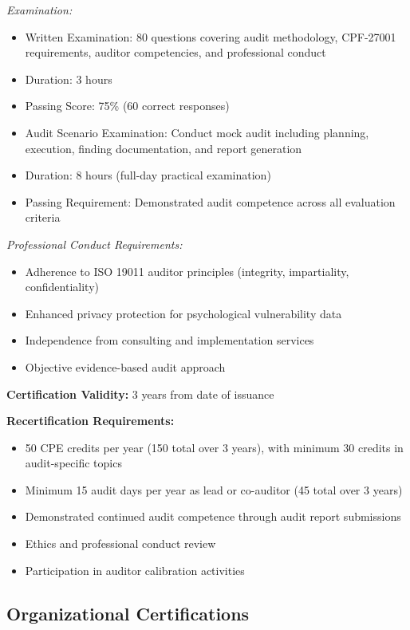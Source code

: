 \documentclass[11pt,a4paper]{article}
\begin{document}
\textit{Examination:}
\begin{itemize}
\item Written Examination: 80 questions covering audit methodology, CPF-27001 requirements, auditor competencies, and professional conduct
\item Duration: 3 hours
\item Passing Score: 75\% (60 correct responses)
\item Audit Scenario Examination: Conduct mock audit including planning, execution, finding documentation, and report generation
\item Duration: 8 hours (full-day practical examination)
\item Passing Requirement: Demonstrated audit competence across all evaluation criteria
\end{itemize}

\textit{Professional Conduct Requirements:}
\begin{itemize}
\item Adherence to ISO 19011 auditor principles (integrity, impartiality, confidentiality)
\item Enhanced privacy protection for psychological vulnerability data
\item Independence from consulting and implementation services
\item Objective evidence-based audit approach
\end{itemize}

\textbf{Certification Validity:} 3 years from date of issuance

\textbf{Recertification Requirements:}
\begin{itemize}
\item 50 CPE credits per year (150 total over 3 years), with minimum 30 credits in audit-specific topics
\item Minimum 15 audit days per year as lead or co-auditor (45 total over 3 years)
\item Demonstrated continued audit competence through audit report submissions
\item Ethics and professional conduct review
\item Participation in auditor calibration activities
\end{itemize}

\subsection{Organizational Certifications}
\end{document}
